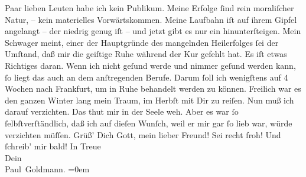 \begin{ledgroupsized}[t]{13cm}
               Paar lieben Leuten habe ich kein Publikum. Meine Erfolge ſind rein moraliſcher Natur,
               – kein materielles Vorwärtskommen. Meine Laufbahn iſt auf ihrem Gipfel angelangt –
               der niedrig genug iſt – und jetzt gibt es nur ein hinunterſteigen.\pend
           \pstart
           {\pb}Mein Schwager meint, einer der Hauptgründe des mangelnden
               Heilerfolges ſei der Umſtand, daß mir die geiſtige Ruhe während der Kur gefehlt hat.
               Es iſt etwas Richtiges daran. Wenn ich nicht geſund werde und nimmer geſund werden
               kann, ſo liegt das auch an dem anſtregenden Berufe. Darum ſoll ich wenigſtens auf 4
               Wochen nach Frankfurt, um in Ruhe behandelt
               werden zu können. Freilich war es den ganzen Winter lang mein Traum, im Herbſt mit
               Dir zu reiſen. Nun muß ich darauf verzichten. Das thut mir in der Seele {\pb}weh. Aber es war ſo ſelbſtverſtändlich, daß ich auf
               dieſen Wunſch, weil er mir gar ſo lieb war, würde verzichten müſſen.\pend
           \pstart
           Grüß’ Dich Gott, mein lieber Freund! Sei recht froh! Und ſchreib’ mir bald!\pend
           \pstart
           In Treue {\\[\baselineskip]}Dein {\\[\baselineskip]}\spacefill\mbox{Paul Goldmann.}\pend
           \leftskip=0em{}\endnumbering{}\end{ledgroupsized}  \newcommand{\dateiname}{L02617}\newcommand{\titel}{Paul Goldmann an Arthur Schnitzler, 21. 4. [1894]}\newcommand{\editorInnen}{Martin Anton Müller und Laura Untner}
      